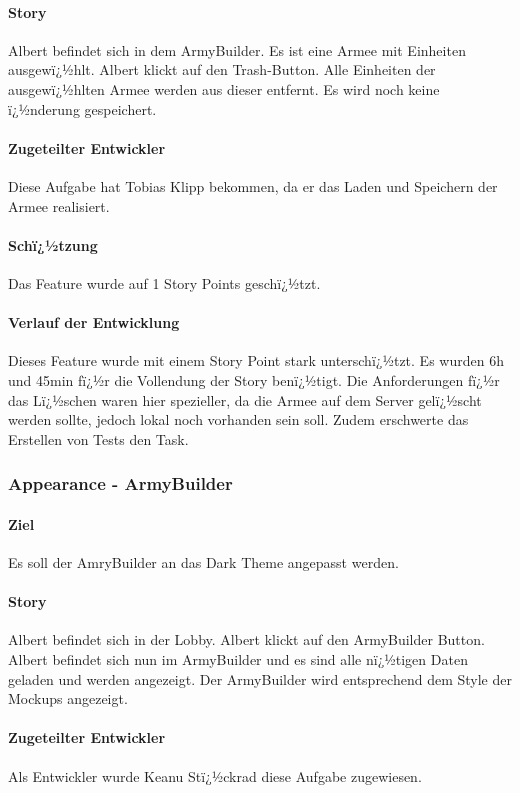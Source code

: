 \documentclass[12pt, titlepage]{scrartcl}
\begin{document}
			\paragraph{Story}Albert befindet sich in dem ArmyBuilder. Es ist eine Armee mit Einheiten ausgewï¿½hlt. Albert klickt auf den Trash-Button. Alle Einheiten der ausgewï¿½hlten Armee werden aus dieser entfernt. Es wird noch keine ï¿½nderung gespeichert.
			\paragraph{Zugeteilter Entwickler} Diese Aufgabe hat Tobias Klipp bekommen, da er das Laden und Speichern der Armee realisiert.
			\paragraph{Schï¿½tzung}
			Das Feature wurde auf 1 Story Points geschï¿½tzt.
			\paragraph{Verlauf der Entwicklung} 
			Dieses Feature wurde mit einem Story Point stark unterschï¿½tzt. Es wurden 6h und 45min fï¿½r die Vollendung der Story benï¿½tigt. Die Anforderungen fï¿½r das Lï¿½schen waren hier spezieller, da die Armee auf dem Server gelï¿½scht werden sollte, jedoch lokal noch vorhanden sein soll. Zudem erschwerte das Erstellen von Tests den Task.
			
			\subsubsection{Appearance - ArmyBuilder}
			\paragraph{Ziel} Es soll der AmryBuilder an das Dark Theme angepasst werden.
			\paragraph{Story} Albert befindet sich in der Lobby. Albert klickt auf den ArmyBuilder Button. Albert befindet sich nun im ArmyBuilder und es sind alle nï¿½tigen Daten geladen und werden angezeigt. Der ArmyBuilder wird entsprechend dem Style der Mockups angezeigt.
			\paragraph{Zugeteilter Entwickler} Als Entwickler wurde Keanu Stï¿½ckrad diese Aufgabe zugewiesen.
\end{document}

